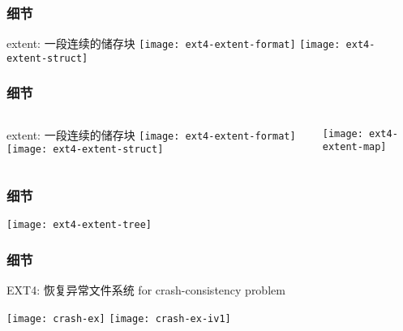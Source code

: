 \begin{frame}[fragile]
	\frametitle{细节}
		\Large
	extent: 一段连续的储存块
\centering
	\texttt{[image: ext4-extent-format]}
	\texttt{[image: ext4-extent-struct]}
\end{frame}


\begin{frame}[fragile]
	\frametitle{细节}
	\begin{columns}
	\begin{column}{.4\textwidth}
		
	extent: 一段连续的储存块
\centering
\texttt{[image: ext4-extent-format]}
\texttt{[image: ext4-extent-struct]}
		
	\end{column}
	
		\begin{column}{.6\textwidth}			

	\texttt{[image: ext4-extent-map]}

	
\end{column}
\end{columns}

\end{frame}


\begin{frame}[fragile]
	\frametitle{细节}
	\centering
	\texttt{[image: ext4-extent-tree]}

\end{frame}




\begin{frame}[fragile]
	\frametitle{细节}
	EXT4: 恢复异常文件系统 for crash-consistency problem
	
	\centering
	\texttt{[image: crash-ex]}
	\texttt{[image: crash-ex-iv1]}
\end{frame}


